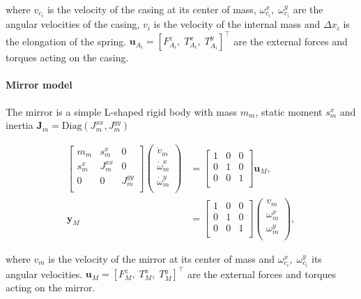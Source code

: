 where $v_{c_i}$ is the velocity of the casing at its center of mass, $\omega_{c_i}^x, \; \omega_{c_i}^y$ are the angular velocities of the casing, $v_i$ is the velocity of the internal mass and $\Delta x_i$ is the elongation of the spring. $\bm{u}_{A_i} = [F_{A_i}^z, \;  T_{A_i}^x, \;  T_{A_i}^y]^\top$ are the external forces and torques acting on the casing.

\paragraph{Mirror model} The mirror is a simple L-shaped rigid body with mass $m_m$, static moment $s_m^x$ and inertia $\mathbf{J}_m = \mathrm{Diag}({J}_{m}^{xx}, {J}_{m}^{yy})$

\begin{equation}
\begin{aligned}
\begin{bmatrix}
m_{m} & s_m^x & 0\\
s_m^x & {J}_{m}^{xx} & 0 \\
0 & 0 & {J}_{m}^{yy} \\
\end{bmatrix}
\begin{pmatrix}
\dot{v}_{m} \\
\dot{\omega}_{m}^x \\
\dot{\omega}_{m}^y \\
\end{pmatrix} &= 
\begin{bmatrix}
1 & 0 & 0 \\
0 & 1 & 0 \\
0 & 0 & 1 \\
\end{bmatrix}\mathbf{u}_M, \\
\mathbf{y}_M &= \begin{bmatrix}
1 & 0 & 0 \\
0 & 1 & 0 \\
0 & 0 & 1 \\
\end{bmatrix}
\begin{pmatrix}
{v}_{m} \\
{\omega}_{m}^x \\
{\omega}_{m}^y \\
\end{pmatrix},
\end{aligned}
\end{equation}

where $v_{m}$ is the velocity of the mirror at its center of mass and $\omega_{c_i}^x, \; \omega_{c_i}^y$ its angular velocities. $\mathbf{u}_M = [F_{M}^z, \;  T_{M}^x, \;  T_{M}^y]^\top$ are the external forces and torques acting on the mirror.

